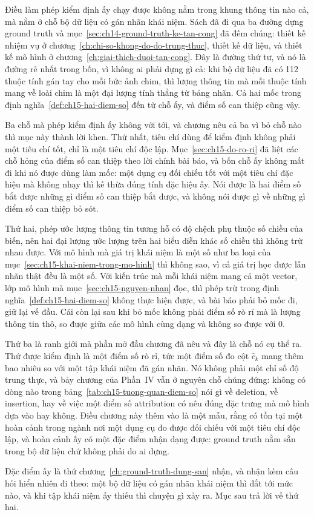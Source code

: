 %
%
Điều làm phép kiểm định ấy chạy được không nằm trong khung thông tin nào cả, mà
nằm ở chỗ bộ dữ liệu có gán nhãn khái niệm. Sách đã đi qua ba đường dựng ground
truth và mục~\ref{sec:ch14-ground-truth-ke-tan-cong} đã đếm chúng: thiết kế
nhiệm vụ ở chương~\ref{ch:chi-so-khong-do-do-trung-thuc}, thiết kế dữ liệu, và
thiết kế mô hình ở chương~\ref{ch:giai-thich-duoi-tan-cong}. Đây là đường thứ
tư, và nó là đường rẻ nhất trong bốn, vì không ai phải dựng gì cả: khi bộ dữ
liệu đã có 112 thuộc tính gán tay cho mỗi bức ảnh chim, thì lượng thông tin mà
mỗi thuộc tính mang về loài chim là một đại lượng tính thẳng từ bảng nhãn. Cả hai
mốc trong định nghĩa~\ref{def:ch15-hai-diem-so} đến từ chỗ ấy, và điểm số can thiệp
cũng vậy.

%
Ba chỗ mà phép kiểm định ấy không với tới, và chương nêu cả ba vì bỏ chỗ nào thì
mục này thành lời khen. Thứ nhất, tiêu chí dùng để kiểm định không phải một tiêu
chí tốt, chỉ là một tiêu chí độc lập. Mục~\ref{sec:ch15-do-ro-ri} đã liệt các
chỗ hỏng của điểm số can thiệp theo lời chính bài báo, và bốn chỗ ấy không mất đi
khi nó được dùng làm mốc: một dụng cụ đối chiếu tốt với một tiêu chí đặc hiệu mà
không nhạy thì kế thừa đúng tính đặc hiệu ấy. Nói được là hai điểm số bắt được
những gì điểm số can thiệp bắt được, và không nói được gì về những gì
điểm số can thiệp bỏ sót.

Thứ hai, phép ước lượng thông tin tương hỗ có độ chệch phụ thuộc số chiều của
biến, nên hai đại lượng ước lượng trên hai biểu diễn khác số chiều thì không trừ
nhau được. Với mô hình mà giá trị khái niệm là một số như ba loại của
mục~\ref{sec:ch15-khai-niem-trong-mo-hinh} thì không sao, vì cả giá trị học được
lẫn nhãn thật đều là một số. Với kiến trúc mà mỗi khái niệm mang cả một vector,
lớp mô hình mà mục~\ref{sec:ch15-nguyen-nhan} đọc, thì phép trừ trong
định nghĩa~\ref{def:ch15-hai-diem-so} không thực hiện được, và bài báo phải bỏ
mốc đi, giữ lại vế đầu. Cái còn lại sau khi bỏ mốc không phải điểm số rò rỉ mà
là lượng thông tin thô, so được giữa các mô hình cùng dạng và không so được với
0.

Thứ ba là ranh giới mà phần mở đầu chương đã nêu và đây là chỗ nó cụ thể ra.
Thứ được kiểm định là một điểm số rò rỉ, tức một điểm số đo cột $\hat c_k$ mang
thêm bao nhiêu so với một tập khái niệm đã gán nhãn. Nó không phải một chỉ số độ
trung thực, và bảy chương của Phần~IV vẫn ở nguyên chỗ chúng đứng: không có
dòng nào trong bảng~\ref{tab:ch15-tuong-quan-diem-so} nói gì về deletion, về
insertion, hay về việc một điểm số attribution có nêu đúng đặc trưng mà mô hình
dựa vào hay không. Điều chương này thêm vào là một mẫu, rằng có tồn tại một hoàn
cảnh trong ngành nơi một dụng cụ đo được đối chiếu với một tiêu chí độc lập, và
hoàn cảnh ấy có một đặc điểm nhận dạng được: ground truth nằm sẵn trong bộ dữ
liệu chứ không phải do ai dựng.

%
Đặc điểm ấy là thứ chương~\ref{ch:ground-truth-dung-san} nhận, và nhận kèm câu
hỏi hiển nhiên đi theo: một bộ dữ liệu có gán nhãn khái niệm thì đắt tới mức
nào, và khi tập khái niệm ấy thiếu thì chuyện gì xảy ra. Mục sau trả lời vế thứ
hai.
